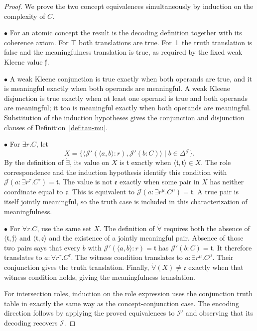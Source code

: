 \documentclass[letterpaper]{article} %
\theoremstyle{definition}
\theoremstyle{definition}
\theoremstyle{definition}
\theoremstyle{definition}
\theoremstyle{definition}
\newcommand{\vt}{\mathfrak{t}}
\newcommand{\vf}{\mathfrak{f}}
\newcommand{\vu}{\mathfrak{e}}
\begin{document}
\begin{proof}
We prove the two concept equivalences simultaneously by induction on the complexity of $C$.

\noindent$\bullet$ For an atomic concept the result is the decoding definition together with its coherence axiom. For $\top$ both translations are true. For $\bot$ the truth translation is false and the meaningfulness translation is true, as required by the fixed weak Kleene value $\vf$.

\noindent$\bullet$ A weak Kleene conjunction is true exactly when both operands are true, and it is meaningful exactly when both operands are meaningful. A weak Kleene disjunction is true exactly when at least one operand is true and both operands are meaningful; it too is meaningful exactly when both operands are meaningful. Substitution of the induction hypotheses gives the conjunction and disjunction clauses of Definition~\ref{def:tau-mu}.

\noindent$\bullet$ For $\exists r.C$, let
\[
X=\{\langle\mathcal{J}'(\langle a,b\rangle:r),\mathcal{J}'(b:C)\rangle\mid b\in\Delta^{\mathcal{J}}\}.
\]
By the definition of $\dot{\exists}$, its value on $X$ is $\vt$ exactly when $\langle\vt,\vt\rangle\in X$. The role correspondence and the induction hypothesis identify this condition with $\mathcal{J}(a:\exists r^{\tau}.C^{\tau})=\vt$. The value is not $\vu$ exactly when some pair in $X$ has neither coordinate equal to $\vu$. This is equivalent to $\mathcal{J}(a:\exists r^{\mu}.C^{\mu})=\vt$. A true pair is itself jointly meaningful, so the truth case is included in this characterization of meaningfulness.

\noindent$\bullet$ For $\forall r.C$, use the same set $X$. The definition of $\dot{\forall}$ requires both the absence of $\langle\vt,\vf\rangle$ and $\langle\vt,\vu\rangle$ and the existence of a jointly meaningful pair. Absence of those two pairs says that every $b$ with $\mathcal{J}'(\langle a,b\rangle:r)=\vt$ has $\mathcal{J}'(b:C)=\vt$. It therefore translates to $a:\forall r^{\tau}.C^{\tau}$. The witness condition translates to $a:\exists r^{\mu}.C^{\mu}$. Their conjunction gives the truth translation. Finally, $\dot{\forall}(X)\neq\vu$ exactly when that witness condition holds, giving the meaningfulness translation.

For intersection roles, induction on the role expression uses the conjunction truth table in exactly the same way as the concept-conjunction case. The encoding direction follows by applying the proved equivalences to $\mathcal{I}'$ and observing that its decoding recovers $\mathcal{I}$.
\end{proof}
\end{document}
